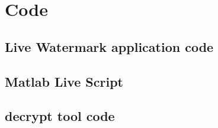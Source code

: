 \chapter{Code}
\label{code}
\section{Live Watermark application code}


\section{Matlab Live Script }


\section{decrypt tool code}
